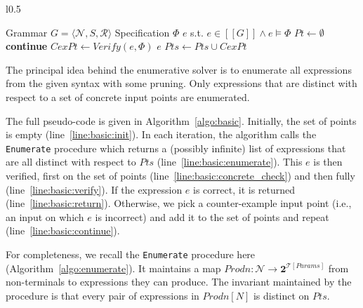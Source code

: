 \documentclass{llncs}
\newcommand\tuple[1]{\langle #1 \rangle}
\newcommand\True{\mathit{True}}
\newcommand\Points{\mathit{Pts}}
\newcommand\Point{\mathit{Pt}}
\newcommand\Verify{\mathit{Verify}}
\newcommand\CexInput{\mathit{CexPt}}
\newcommand\Expr{e}
\newcommand\Powerset[1]{\mathbf{2}^{#1}}
\newcommand\Spec{\Phi}
\newcommand\Grammar{G}
\newcommand\sem[1]{[\![ #1 ]\!]}
\newcommand\FormalParameters{\mathit{Params}}
\newcommand\Productions{\mathit{Prodn}}
\newcommand\NonTerminals{\mathcal{N}}
\newcommand\NonTerminal{N}
\newcommand\StartSymbol{S}
\newcommand\Rules{\mathcal{R}}
\newcommand\Theory{\mathcal{T}}
\begin{document}
\begin{wrapfigure}{l}{0.5\textwidth}
  \begin{minipage}{0.5\textwidth}
    \begin{algorithm}[H]
      \begin{algorithmic}[1]
        \Require Grammar $\Grammar = \tuple { \NonTerminals, \StartSymbol, \Rules }$
        \Require Specification $\Spec$
        \Ensure $\Expr$ s.t.  $\Expr \in \sem{\Grammar} \wedge \Expr \models \Spec$
        \State $\Point \gets \emptyset$ \label{line:basic:init}
        \While { $\True$ }
        \For {$\Expr \in \Call{Enumerate}{\Grammar,\Points}$ }\label{line:basic:enumerate}
        \If { $\Expr \models \Spec \downharpoonleft  \Points$ } \textbf{continue} \EndIf\label{line:basic:concrete_check}
        \State $\CexInput \gets \Verify(\Expr, \Spec)$ \label{line:basic:verify}
        \If { $\CexInput = \bot$ } \Return $\Expr$ \EndIf \label{line:basic:return}
        \State $\Points \gets \Points \cup \CexInput$ \label{line:basic:continue}
        \EndFor
        \EndWhile
      \end{algorithmic}
      \caption{Enumerative Solver}
      \label{algo:basic}
    \end{algorithm}
  \end{minipage}
\end{wrapfigure}
The principal idea behind the enumerative solver is to enumerate all
expressions from the given syntax with some pruning.
Only expressions that are distinct with respect to a set of concrete
input points are enumerated.

The full pseudo-code is given in Algorithm~\ref{algo:basic}.
Initially, the set of points is empty (line~\ref{line:basic:init}).
In each iteration, the algorithm calls the {\tt Enumerate} procedure
which returns a (possibly infinite) list of expressions that are all
distinct with respect to $\Points$ (line~\ref{line:basic:enumerate}).
This $\Expr$ is then verified, first on the set of points
(line~\ref{line:basic:concrete_check}) and then fully
(line~\ref{line:basic:verify}).
If the expression $\Expr$ is correct, it is returned
(line~\ref{line:basic:return}).
Otherwise, we pick a counter-example input point (i.e., an input on
which $\Expr$ is incorrect) and add it to the set of points and repeat
(line~\ref{line:basic:continue}).

For completeness, we recall the {\tt Enumerate} procedure here
(Algorithm~\ref{algo:enumerate}).
It maintains a map $\Productions : \NonTerminals \to
\Powerset{\Theory[\FormalParameters]}$ from non-terminals to
expressions they can produce.
The invariant maintained by the procedure is that every pair of
expressions in $\Productions[\NonTerminal]$ is distinct on $\Points$.
\end{document}
